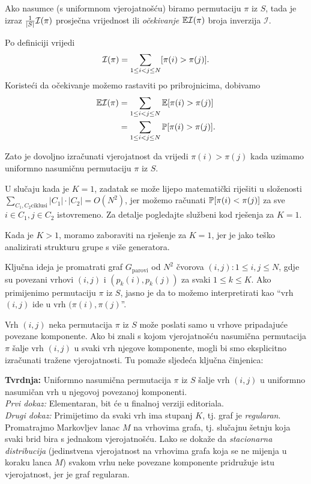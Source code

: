 Ako nasumce (s uniformnom vjerojatnošću) biramo permutaciju $\pi$ iz
$S$, tada je izraz $\frac{1}{|S|} \mathcal I(\pi)$ prosječna vrijednost
ili \textit{očekivanje} $\mathbb E\mathcal{I}(\pi)$ broja inverzija $\mathcal{I}$.

Po definiciji vrijedi
\begin{equation*}
  \mathcal I(\pi) = \sum\limits_{1 \le i < j \le N} [ \pi(i) > \pi(j) ]. 
\end{equation*}
Koristeći da očekivanje možemo rastaviti po pribrojnicima, dobivamo
\begin{align*}
  \mathbb E \mathcal I(\pi)  &= \sum\limits_{1 \le i < j \le N} \mathbb E [ \pi(i) > \pi(j) ] \\
                &= \sum\limits_{1 \le i < j \le N} \mathbb P [ \pi(i) > \pi(j) ]. 
\end{align*}

Zato je dovoljno izračunati vjerojatnost da vrijedi $\pi(i) > \pi(j)$
kada uzimamo uniformno nasumičnu permutaciju $\pi$ iz $S$.

U slučaju kada je $K = 1$, zadatak se može lijepo matematički riješiti
u složenosti $\sum_{C_1, C_2 \text{ciklusi}} |C_1| \cdot |C_2| 
= O(N^2)$, jer možemo računati $\mathbb P[\pi(i) < \pi(j)]$ za
sve $i \in C_1, j \in C_2$ istovremeno. Za detalje pogledajte službeni kod
rješenja za $K = 1$.

Kada je $K > 1$, moramo zaboraviti na rješenje za $K = 1$, jer je jako
teško analizirati strukturu grupe s više generatora.

Ključna ideja je promatrati graf $G_{\text{parovi}}$ 
od $N^2$ čvorova $(i, j) : 1 \le i, j \le N$,
gdje su povezani vrhovi $(i, j)$ i $(p_k(i), p_k(j))$ za svaki $1 \le k \le K$.
Ako primijenimo permutaciju $\pi$ iz $S$, jasno je da to možemo
interpretirati kao ``vrh $(i, j)$ ide u vrh $(\pi(i), \pi(j)$''.

Vrh $(i, j)$ neka permutacija $\pi$ iz $S$ 
može poslati samo u vrhove pripadajuće povezane komponente.
Ako bi znali s kojom vjerojatnošću nasumična permutacija $\pi$
šalje vrh $(i, j)$ u svaki vrh njegove komponente, 
mogli bi smo eksplicitno izračunati tražene vjerojatnosti.
Tu pomaže sljedeća ključna činjenica:

\textbf{Tvrdnja:} Uniformno nasumična permutacija $\pi$ iz $S$ šalje
vrh $(i, j)$ u uniformno nasumičan vrh u njegovoj povezanoj komponenti. \\
\textit{Prvi dokaz:} Elementaran, bit će u finalnoj verziji editoriala. \\
\textit{Drugi dokaz:} Primijetimo da svaki vrh ima stupanj $K$,
tj. graf je \textit{regularan}.
Promatrajmo Markovljev lanac $M$ na vrhovima grafa,
tj. slučajnu šetnju koja svaki brid bira s jednakom vjerojatnošću.
Lako se dokaže da \textit{stacionarna distribucija} (jedinstvena
vjerojatnost na vrhovima grafa koja se ne mijenja u koraku lanca $M$)
svakom vrhu neke povezane komponente pridružuje istu vjerojatnost,
jer je graf regularan. 

